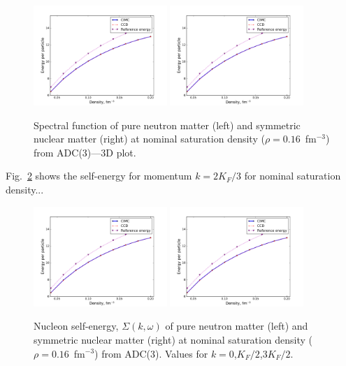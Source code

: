 \begin{figure}[ht]
\begin{center}
\includegraphics[width=0.45\textwidth]{Chapter11-figures/cimcccd.pdf}
\includegraphics[width=0.45\textwidth]{Chapter11-figures/cimcccd.pdf}
\caption{Spectral function of pure neutron matter (left) and symmetric nuclear matter (right) at nominal saturation density ($\rho=0.16$~fm$^{-3}$) from ADC(3)---3D plot. }
\label{fig:minn_adc_sfnct}
\end{center}
\end{figure}



Fig.~\ref{fig:minn_SE} shows the self-energy for momentum $k=2 K_F/3$  for nominal saturation density...

\begin{figure}[ht]
\begin{center}
\includegraphics[width=0.45\textwidth]{Chapter11-figures/cimcccd.pdf}
\includegraphics[width=0.45\textwidth]{Chapter11-figures/cimcccd.pdf}
\caption{Nucleon self-energy, $\Sigma(k,\omega)$ of pure neutron matter (left) and symmetric nuclear matter (right) at nominal saturation density ($\rho=0.16$~fm$^{-3}$) from ADC(3).  Values for $k=0$,$K_F/2$,$3K_F/2$. }
\label{fig:minn_SE}
\end{center}
\end{figure}


